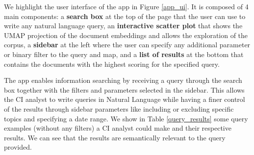 \documentclass[a4paper]{article}
\begin{document}
We highlight the user interface of the app in Figure \ref{app_ui}. It is composed of 4 main components: a \textbf{search box} at the top of the page that the user can use to write any natural language query, an \textbf{interactive scatter plot} that shows the UMAP projection of the document embeddings and allows the exploration of the corpus, a \textbf{sidebar} at the left where the user can specify any additional parameter or binary filter to the query and map, and a \textbf{list of results} at the bottom that contains the documents with the highest scoring for the specified query.

The app enables information searching by receiving a query through the search box together with the filters and parameters selected in the sidebar. This allows the CI analyst to write queries in Natural Language while having a finer control of the results through sidebar parameters like including or excluding specific topics and specifying a date range. We show in Table \ref{query_results} some query examples (without any filters) a CI analyst could make and their respective results. We can see that the results are semantically relevant to the query provided.
\end{document}
